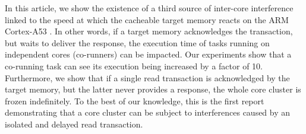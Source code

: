     In this article, we show the existence of a third source of inter-core interference linked to the speed at which the cacheable target memory reacts on the ARM Cortex-A53 \cite{ARM-cortex-A53}.
    In other words, if a target memory acknowledges the transaction, but waits to deliver the response, the execution time of tasks running on independent cores (co-runners) can be impacted.
    Our experiments show that a co-running task can see its execution being increased by a factor of 10.
    Furthermore, we show that if a single read transaction is acknowledged by the target memory, but the latter never provides a response, the whole core cluster is frozen indefinitely.
    To the best of our knowledge, this is the first report demonstrating that a core cluster can be subject to interferences caused by an isolated and delayed read transaction.
